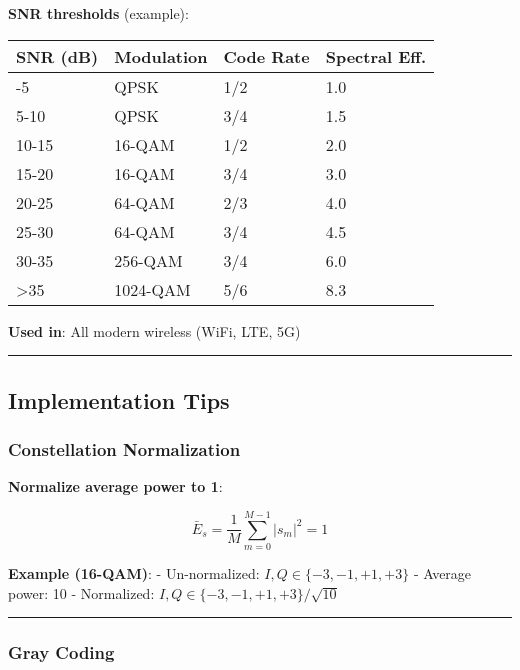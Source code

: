 \textbf{SNR thresholds} (example):

{\def\LTcaptype{} %
\begin{longtable}[]{@{}llll@{}}
\toprule\noalign{}
SNR (dB) & Modulation & Code Rate & Spectral Eff. \\
\midrule\noalign{}
\endhead
\bottomrule\noalign{}
\endlastfoot
0-5 & QPSK & 1/2 & 1.0 \\
5-10 & QPSK & 3/4 & 1.5 \\
10-15 & 16-QAM & 1/2 & 2.0 \\
15-20 & 16-QAM & 3/4 & 3.0 \\
20-25 & 64-QAM & 2/3 & 4.0 \\
25-30 & 64-QAM & 3/4 & 4.5 \\
30-35 & 256-QAM & 3/4 & 6.0 \\
\textgreater35 & 1024-QAM & 5/6 & 8.3 \\
\end{longtable}
}

\textbf{Used in}: All modern wireless (WiFi, LTE, 5G)

\begin{center}\rule{0.5\linewidth}{0.5pt}\end{center}

\subsection{Implementation Tips}\label{implementation-tips}

\subsubsection{Constellation
Normalization}\label{constellation-normalization}

\textbf{Normalize average power to 1}:

\[
\bar{E}_s = \frac{1}{M}\sum_{m=0}^{M-1} |s_m|^2 = 1
\]

\textbf{Example (16-QAM)}: - Un-normalized:
\(I, Q \in \{-3, -1, +1, +3\}\) - Average power: 10 - Normalized:
\(I, Q \in \{-3, -1, +1, +3\}/\sqrt{10}\)

\begin{center}\rule{0.5\linewidth}{0.5pt}\end{center}

\subsubsection{Gray Coding}\label{gray-coding}

